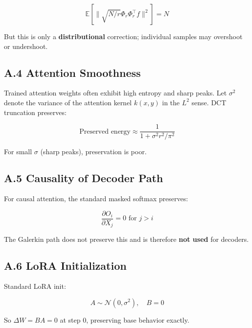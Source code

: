 \[
\mathbb{E}[\|\sqrt{N/r} \Phi_r \Phi_r^\top f\|^2] = N
\]

But this is only a \textbf{distributional} correction; individual samples may 
overshoot or undershoot.

\subsection{A.4 Attention Smoothness}

Trained attention weights often exhibit high entropy and sharp peaks. Let 
$\sigma^2$ denote the variance of the attention kernel $k(x, y)$ in the 
$L^2$ sense. DCT truncation preserves:

\[
\text{Preserved energy} \approx \frac{1}{1 + \sigma^2 r^2 / \pi^2}
\]

For small $\sigma$ (sharp peaks), preservation is poor.

\subsection{A.5 Causality of Decoder Path}

For causal attention, the standard masked softmax preserves:

\[
\frac{\partial O_i}{\partial X_j} = 0 \text{ for } j > i
\]

The Galerkin path does not preserve this and is therefore \textbf{not used} for 
decoders.

\subsection{A.6 LoRA Initialization}

Standard LoRA init:

\[
A \sim \mathcal{N}(0, \sigma^2), \quad B = 0
\]

So $\Delta W = BA = 0$ at step 0, preserving base behavior exactly.

